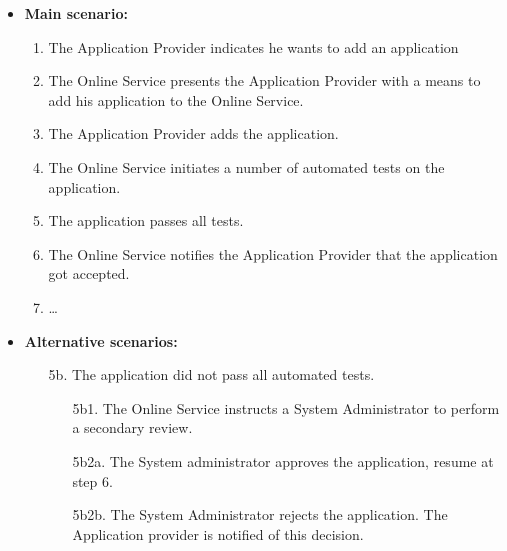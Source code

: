\begin{itemize}
    \item \textbf{Main scenario:} 
    \begin{enumerate}
       \item The Application Provider indicates he wants to add an application
       \item The Online Service presents the Application Provider with a means to add his application to the Online Service.
       \item The Application Provider adds the application.
	\item The Online Service initiates a number of automated tests on the application.
	\item The application passes all tests.
	\item The Online Service notifies the Application Provider that the application got accepted.
       \item \ldots
    \end{enumerate}

    \item \textbf{Alternative scenarios:} 
    \begin{enumerate}
        \item [5b.] The application did not pass all automated tests.
	\begin{enumerate}
		\item [5b1.] The Online Service instructs a System Administrator to perform a secondary review.
		\item [5b2a.] The System administrator approves the application, resume at step 6.
		\item [5b2b.] The System Administrator rejects the application. The Application provider is notified of this decision.
	\end{enumerate}
    \end{enumerate}
\end{itemize}

